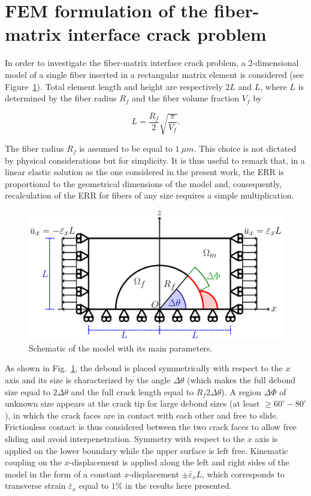 \section{FEM formulation of the fiber-matrix interface crack problem}\label{paperA:sec:femmodel}

In order to investigate the fiber-matrix interface crack problem, a 2-dimensional model of a single fiber inserted in a rectangular matrix element is considered (see Figure~\ref{paperA:fig:modelschem}). Total element length and height are respectively $2L$ and $L$, where $L$ is determined by the fiber radius $R_{f}$ and the fiber volume fraction $V_{f}$ by

\begin{equation}\label{paperA:eq:LVf}
L=\frac{R_{f}}{2}\sqrt{\frac{\pi}{V_{f}}}.
\end{equation}

The fiber radius $R_{f}$ is assumed to be equal to $1\ \mu m$. This choice is not dictated by physical considerations but for simplicity. It is thus useful to remark that, in a linear elastic solution as the one considered in the present work, the ERR is proportional to the geometrical dimensions of the model and, consequently, recalculation of the ERR for fibers of any size requires a simple multiplication.

\begin{figure}[!h]
\centering
\includegraphics[width=\textwidth]{paperA/RUC.pdf}
\caption{Schematic of the model with its main parameters.}\label{paperA:fig:modelschem}
\end{figure}

As shown in Fig.~\ref{paperA:fig:modelschem}, the debond is placed symmetrically with respect to the $x$ axis and its size is characterized by the angle $\Delta\theta$ (which makes the full debond size equal to $2\Delta\theta$ and the full crack length equal to $R_{f}2{\Delta\theta}$). A region $\Delta\Phi$ of unknown size appears at the crack tip for large debond sizes (at least $\geq 60^{\circ}-80^{\circ}$), in which the crack faces are in contact with each other and free to slide. Frictionless contact is thus considered between the two crack faces to allow free sliding and avoid interpenetration. Symmetry with respect to the $x$ axis is applied on the lower boundary while the upper surface is left free. Kinematic coupling on the $x$-displacement is applied along the left and right sides of the model in the form of a constant $x$-displacement $\pm\bar{\varepsilon}_{x} L$, which corresponds to transverse strain $\bar{\varepsilon}_{x}$ equal to $1\%$ in the results here presented.

